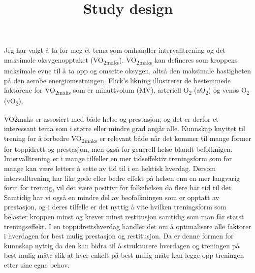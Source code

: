 \documentclass[
  letterpaper,
  DIV=11,
  numbers=noendperiod]{scrartcl}
\title{Study design}
\author{}
\date{}
\begin{document}
\maketitle
\ifdefined\Shaded\renewenvironment{Shaded}{\begin{tcolorbox}[enhanced, sharp corners, boxrule=0pt, breakable, frame hidden, borderline west={3pt}{0pt}{shadecolor}, interior hidden]}{\end{tcolorbox}}\fi

Jeg har valgt å ta for meg et tema som omhandler intervalltrening og det
maksimale oksygenopptaket (VO\textsubscript{2maks}).
VO\textsubscript{2maks} kan defineres som kroppens maksimale evne til å
ta opp og omsette oksygen, altså den maksimale hastigheten på den aerobe
energiomsetningen. Flick's likning illustrerer de bestemmede faktorene
for VO\textsubscript{2maks} som er minuttvolum (MV), arteriell
O\textsubscript{2} (aO\textsubscript{2}) og venøs O\textsubscript{2}
(vO\textsubscript{2}).

VO2maks er assosiert med både helse og prestasjon, og det er derfor et
interessant tema som i større eller mindre grad angår alle. Kunnskap
knyttet til trening for å forbedre VO\textsubscript{2maks} er relevant
både når det kommer til mange former for toppidrett og prestasjon, men
også for generell helse blandt befolknigen. Intervalltrening er i mange
tilfeller en mer tidseffektiv treningsform som for mange kan være
lettere å sette av tid til i en hektisk hverdag. Dersom intervalltrening
har like gode eller bedre effekt på helsen enn en mer langvarig form for
trening, vil det være positivt for folkehelsen da flere har tid til det.
Samtidig har vi også en mindre del av beofolkningen som er opptatt av
prestasjon, og i deres tilfelle er det nyttig å vite hvilken
treningsform som belaster kroppen minst og krever minst restitusjon
samtidig som man får størst treningseffekt. I en toppidrettshverdag
handler det om å optimalisere alle faktorer i hverdagen for best mulig
prestasjon og restitusjon. Da er denne formen for kunnskap nyttig da den
kan bidra til å strukturere hverdagen og treningen på best mulig måte
slik at hver enkelt på best mulig måte kan legge opp treningen etter
sine egne behov.
\end{document}
